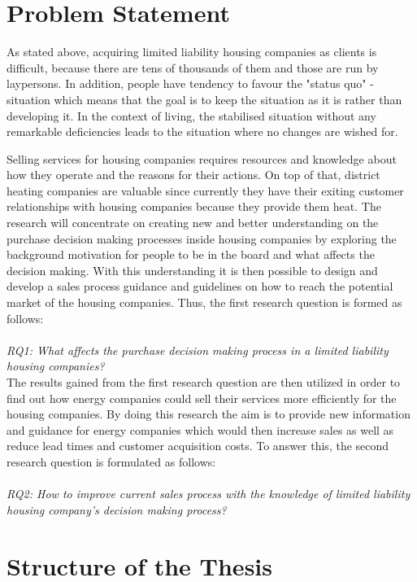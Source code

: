 \section{Problem Statement}

As stated above, acquiring limited liability housing companies as clients is difficult, because there are tens of thousands of them and those are run by laypersons. In addition, people have tendency to favour the "status quo" -situation which means that the goal is to keep the situation as it is rather than developing it. In the context of living, the stabilised situation without any remarkable deficiencies leads to the situation where no changes are wished for. \parencite{AsoyKorjaustoiminta:2013}

Selling services for housing companies requires resources and knowledge about how they operate and the reasons for their actions. On top of that, district heating companies are valuable since currently they have their exiting customer relationships with housing companies because they provide them heat. The research will concentrate on creating new and better understanding on the purchase decision making processes inside housing companies by exploring the background motivation for people to be in the board and what affects the decision making. With this understanding it is then possible to design and develop a sales process guidance and guidelines on how to reach the potential market of the housing companies. Thus, the first research question is formed as follows:\\\\
\emph{RQ1: What affects the purchase decision making process in a limited liability housing companies?}\\

The results gained from the first research question are then utilized in order to find out how energy companies could sell their services more efficiently for the housing companies. By doing this research the aim is to provide new information and guidance for energy companies which would then increase sales as well as reduce lead times and customer acquisition costs. To answer this, the second research question is formulated as follows:\\\\
\emph{RQ2: How to improve current sales process with the knowledge of limited liability housing company's decision making process?}\\

\section{Structure of the Thesis}
\label{section:structure} 

